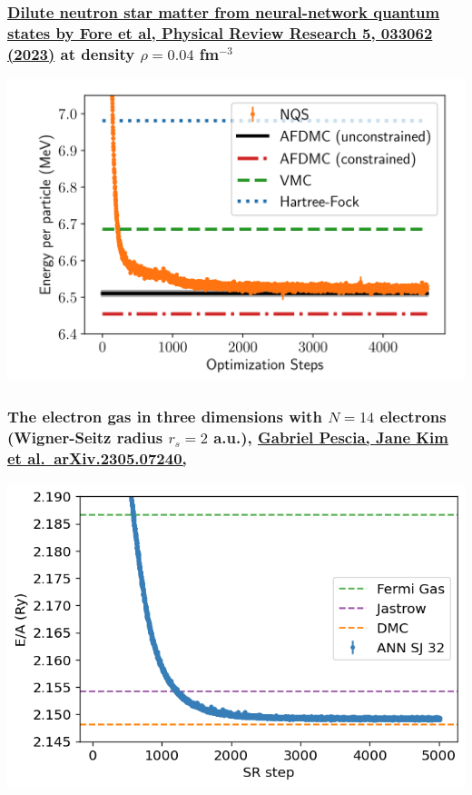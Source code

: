 \documentclass{beamer}
\begin{document}
\begin{frame}
\frametitle{\href{{https://journals.aps.org/prresearch/pdf/10.1103/PhysRevResearch.5.033062}}{Dilute neutron star matter from neural-network quantum states by Fore et al, Physical Review Research 5, 033062 (2023)} at density $\rho=0.04$ fm$^{-3}$}

\begin{block}{}

\vspace{6mm}

\centerline{\includegraphics[width=0.9\linewidth]{figures/nmatter.png}}

\vspace{6mm}

\end{block}
\end{frame}

\begin{frame}
\frametitle{The electron gas in three dimensions with $N=14$ electrons (Wigner-Seitz radius $r_s=2$ a.u.), \href{{https://doi.org/10.48550/arXiv.2305.07240}}{Gabriel Pescia, Jane Kim et al.~arXiv.2305.07240,}}

\begin{block}{}

\vspace{6mm}

\centerline{\includegraphics[width=0.9\linewidth]{figures/elgasnew.png}}

\vspace{6mm}

\end{block}
\end{frame}
\end{document}

